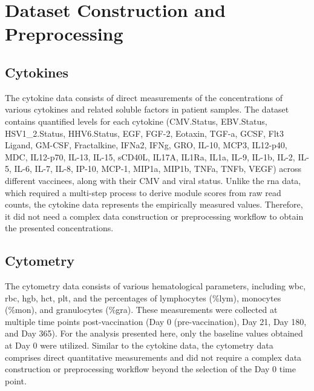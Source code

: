\documentclass[12pt,a4paper]{report}
\begin{document}
\section{Dataset Construction and Preprocessing}
\subsection{Cytokines}
The cytokine data consists of direct measurements of the concentrations of various cytokines and related soluble factors in patient samples. The dataset contains quantified levels for each cytokine (CMV.Status, EBV.Status, HSV1\_2.Status, HHV6.Status, EGF, FGF-2, Eotaxin, TGF-a, GCSF, Flt3 Ligand, GM-CSF, Fractalkine, IFNa2, IFNg, GRO, IL-10, MCP3, IL12-p40, MDC, IL12-p70, IL-13, IL-15, sCD40L, IL17A, IL1Ra, IL1a, IL-9, IL-1b, IL-2, IL-5, IL-6, IL-7, IL-8, IP-10, MCP-1, MIP1a, MIP1b, TNFa, TNFb, VEGF) across different vaccinees, along with their CMV and viral status. Unlike the \acrshort{rna} data, which required a multi-step process to derive module scores from raw read counts, the cytokine data represents the empirically measured values. Therefore, it did not need a complex data construction or preprocessing workflow to obtain the presented concentrations.

\subsection{Cytometry}
The cytometry data consists of various hematological parameters, including \acrfull{wbc}, \acrfull{rbc}, \acrfull{hgb}, \acrfull{hct}, \acrfull{plt}, and the percentages of lymphocytes (\%\acrshort{lym}), monocytes (\%\acrshort{mon}), and granulocytes (\%\acrshort{gra}). These measurements were collected at multiple time points post-vaccination (Day 0 (pre-vaccination), Day 21, Day 180, and Day 365). For the analysis presented here, only the baseline values obtained at Day 0 were utilized. Similar to the cytokine data, the cytometry data comprises direct quantitative measurements and did not require a complex data construction or preprocessing workflow beyond the selection of the Day 0 time point.
\end{document}
